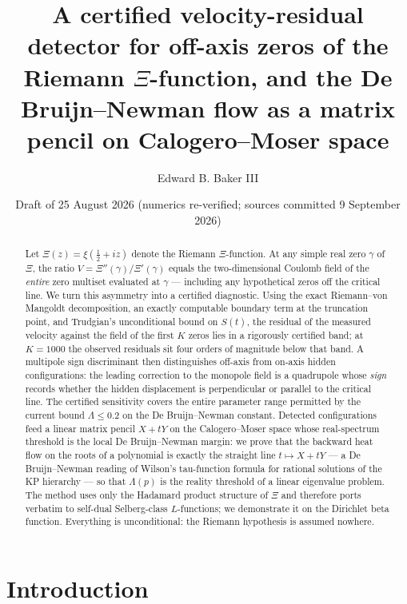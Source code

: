 \documentclass[11pt]{amsart}
\title[A certified detector for off-axis zeros]{A certified velocity-residual detector for off-axis zeros of the Riemann $\Xi$-function, and the De Bruijn--Newman flow as a matrix pencil on Calogero--Moser space}
\author{Edward B. Baker III}
\date{Draft of 25 August 2026 (numerics re-verified; sources committed 9 September 2026)}
\theoremstyle{remark}
\begin{document}
\begin{abstract}
Let $\Xi(z)=\xi(\tfrac12+iz)$ denote the Riemann $\Xi$-function. At any simple real zero $\gamma$ of $\Xi$, the ratio $V=\Xi''(\gamma)/\Xi'(\gamma)$ equals the two-dimensional Coulomb field of the \emph{entire} zero multiset evaluated at $\gamma$ --- including any hypothetical zeros off the critical line. We turn this asymmetry into a certified diagnostic. Using the exact Riemann--von Mangoldt decomposition, an exactly computable boundary term at the truncation point, and Trudgian's unconditional bound on $S(t)$, the residual of the measured velocity against the field of the first $K$ zeros lies in a rigorously certified band; at $K=1000$ the observed residuals sit four orders of magnitude below that band. A multipole sign discriminant then distinguishes off-axis from on-axis hidden configurations: the leading correction to the monopole field is a quadrupole whose \emph{sign} records whether the hidden displacement is perpendicular or parallel to the critical line. The certified sensitivity covers the entire parameter range permitted by the current bound $\Lambda\le 0.2$ on the De Bruijn--Newman constant. Detected configurations feed a linear matrix pencil $X+tY$ on the Calogero--Moser space whose real-spectrum threshold is the local De Bruijn--Newman margin: we prove that the backward heat flow on the roots of a polynomial is exactly the straight line $t\mapsto X+tY$ --- a De Bruijn--Newman reading of Wilson's tau-function formula for rational solutions of the KP hierarchy --- so that $\Lambda(p)$ is the reality threshold of a linear eigenvalue problem. The method uses only the Hadamard product structure of $\Xi$ and therefore ports verbatim to self-dual Selberg-class $L$-functions; we demonstrate it on the Dirichlet beta function. Everything is unconditional: the Riemann hypothesis is assumed nowhere.
\end{abstract}

\maketitle

\section{Introduction}\label{sec:intro}
\end{document}
